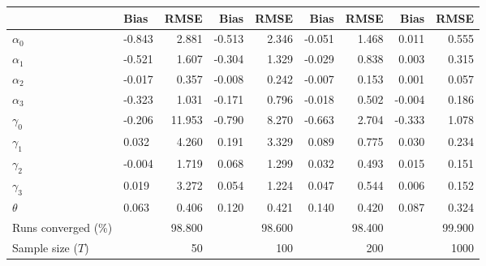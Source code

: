 
\begin{tabular}[t]{llrrrrrrr}
\toprule
  & Bias & RMSE & Bias & RMSE & Bias & RMSE & Bias & RMSE\\
\midrule
$\alpha_{0}$ & -0.843 & 2.881 & -0.513 & 2.346 & -0.051 & 1.468 & 0.011 & 0.555\\
$\alpha_{1}$ & -0.521 & 1.607 & -0.304 & 1.329 & -0.029 & 0.838 & 0.003 & 0.315\\
$\alpha_{2}$ & -0.017 & 0.357 & -0.008 & 0.242 & -0.007 & 0.153 & 0.001 & 0.057\\
$\alpha_{3}$ & -0.323 & 1.031 & -0.171 & 0.796 & -0.018 & 0.502 & -0.004 & 0.186\\
$\gamma_{0}$ & -0.206 & 11.953 & -0.790 & 8.270 & -0.663 & 2.704 & -0.333 & 1.078\\
$\gamma_{1}$ & 0.032 & 4.260 & 0.191 & 3.329 & 0.089 & 0.775 & 0.030 & 0.234\\
$\gamma_{2}$ & -0.004 & 1.719 & 0.068 & 1.299 & 0.032 & 0.493 & 0.015 & 0.151\\
$\gamma_{3}$ & 0.019 & 3.272 & 0.054 & 1.224 & 0.047 & 0.544 & 0.006 & 0.152\\
$\theta$ & 0.063 & 0.406 & 0.120 & 0.421 & 0.140 & 0.420 & 0.087 & 0.324\\
Runs converged (\%) &  & 98.800 &  & 98.600 &  & 98.400 &  & 99.900\\
Sample size ($T$) &  & 50 &  & 100 &  & 200 &  & 1000\\
\bottomrule
\end{tabular}

